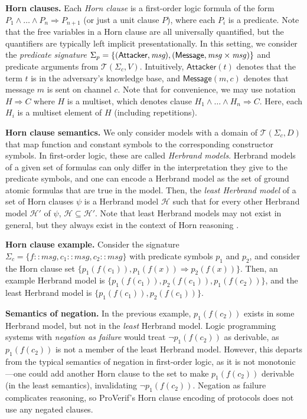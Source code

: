 \documentclass{article}
\theoremstyle{definition}
\begin{document}
\textbf{Horn clauses.} Each \textit{Horn clause} is a first-order logic formula of the form $P_1 \land \dots \land P_n \Rightarrow P_{n+1}$ (or just a unit clause $P$), where each $P_i$ is a predicate.
Note that the free variables in a Horn clause are all universally quantified, but the quantifiers are typically left implicit presentationally.
In this setting, we consider the \textit{predicate signature} 
$ \Sigma_p = \{ (\textsf{Attacker}, \emph{msg}), (\textsf{Message}, \mathit{msg} \times \mathit{msg}) \}$ 
and predicate arguments from $\mathcal{T}(\Sigma_c, V)$.
Intuitively, $\textsf{Attacker}(t)$ denotes that the term $t$ is in the adversary's knowledge base, and $\textsf{Message}(m, c)$ denotes that message $m$ is sent on channel $c$. Note that for convenience, we may use notation $H \Rightarrow C$ where $H$ is a multiset, which denotes clause $H_1 \land \dots \land H_n \Rightarrow C$. Here, each $H_i$ is a multiset element of $H$ (including repetitions). 

\textbf{Horn clause semantics.}
We only consider models with a domain of $\mathcal{T}(\Sigma_c, D)$ that map function and constant symbols to the corresponding constructor symbols. In first-order logic, these are called \emph{Herbrand models}. Herbrand models of a given set of formulas can only differ in the interpretation they give to the predicate symbols, and one can encode a Herbrand model as the set of ground atomic formulas that are true in the model. Then, the \emph{least Herbrand model} of a set of Horn clauses $\psi$ is a Herbrand model $\mathcal{H}$ such that for every other Herbrand model $\mathcal{H}'$ of $\psi$, $\mathcal{H} \subseteq \mathcal{H}'$. Note that least Herbrand models may not exist in general, but they always exist in the context of Horn reasoning \cite{horn_semantics}.

\textbf{Horn clause example.}
Consider the signature $\Sigma_c = \{ f :: \mathit{msg}, c_1 :: \mathit{msg}, c_2 :: \mathit{msg} \}$ with predicate symbols $p_1$ and $p_2$, and consider the Horn clause set $\{ p_1(f(c_1)), p_1(f(x)) \Rightarrow p_2(f(x)) \}$.  Then, an example Herbrand model is $\{ p_1(f(c_1)), p_2(f(c_1)), p_1(f(c_2)) \}$,  and the least Herbrand model is $\{ p_1(f(c_1)), p_2(f(c_1)) \}$. 

\textbf{Semantics of negation.} In the previous example, $p_1(f(c_2))$ exists in some Herbrand model, 
but not in the \emph{least} Herbrand model. 
Logic programming systems with \emph{negation as failure} would treat $\neg p_1(f(c_2))$ as derivable, 
as $p_1(f(c_2))$ is not a member of the least Herbrand model. 
However, this departs from the typical semantics of negation in first-order logic, 
as it is not monotonic---one could add another Horn clause to the set to make $p_1(f(c_2))$ derivable (in the least semantics), 
invalidating $\neg p_1(f(c_2))$. 
Negation as failure complicates reasoning, so ProVerif's Horn clause encoding of protocols does not use any negated clauses. 
\end{document}
